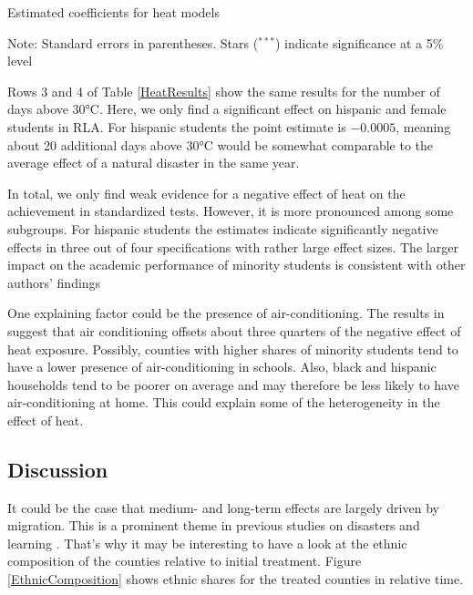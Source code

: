 \begin{table}
	\caption{Estimated coefficients for heat models}
	\label{HeatResults}
	
	{\raggedright Note: Standard errors in parentheses. Stars ($^{***}$) indicate significance at a 5\% level \par}
\end{table}

Rows 3 and 4 of Table \ref{HeatResults} show the same results for the number of days above 30°C. Here, we only find a significant effect on hispanic and female students in RLA. For hispanic students the point estimate is $-0.0005$, meaning about 20 additional days above 30°C would be somewhat comparable to the average effect of a natural disaster in the same year.

In total, we only find weak evidence for a negative effect of heat on the achievement in standardized tests. However, it is more pronounced among some subgroups. For hispanic students the estimates indicate significantly negative effects in three out of four specifications with rather large effect sizes. The larger impact on the academic performance of minority students is consistent with other authors' findings \citep[for example][]{Goodman_2020}

One explaining factor could be the presence of air-conditioning. The results in \cite{Goodman_2020} suggest that air conditioning offsets about three quarters of the negative effect of heat exposure. Possibly, counties with higher shares of minority students tend to have a lower presence of air-conditioning in schools. Also, black and hispanic households tend to be poorer on average and may therefore be less likely to have air-conditioning at home. This could explain some of the heterogeneity in the effect of heat.


\subsection{Discussion}

It could be the case that medium- and long-term effects are largely driven by migration. This is a prominent theme in previous studies on disasters and learning \citep{Pane_2008, Sacerdote_2012}. That's why it may be interesting to have a look at the ethnic composition of the counties relative to initial treatment. Figure \ref{EthnicComposition} shows ethnic shares for the treated counties in relative time.

